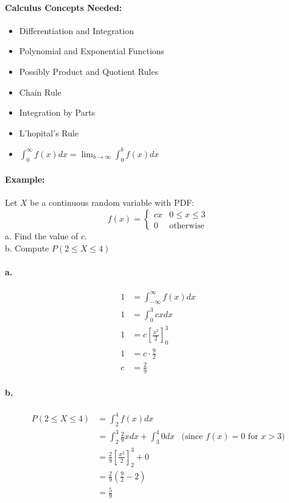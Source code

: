 \paragraph{Calculus Concepts Needed:}
\begin{itemize}
    \item Differentiation and Integration
    \item Polynomial and Exponential Functions
    \item Possibly Product and Quotient Rules
    \item Chain Rule
    \item Integration by Parts
    \item L'hopital's Rule
    \item $\int_0^\infty f(x) dx = \lim_{b \to \infty} \int_0^b f(x) dx$
\end{itemize}

\paragraph*{Example:}
Let $X$ be a continuous random variable with PDF:
\[
    f(x) = \begin{cases}
        cx & 0 \leq x \leq 3 \\
        0 & \text{otherwise}
    \end{cases}
\]
a. Find the value of $c$.\\
b. Compute $P(2 \leq X \leq 4)$\\

\paragraph*{a.}
\begin{align*}
    1 &= \int_{-\infty}^{\infty} f(x) dx \\
    1 &= \int_0^3 cx dx \\
    1 &= c \left[ \frac{x^2}{2} \right]_0^3 \\
    1 &= c \cdot \frac{9}{2} \\
    c &= \frac{2}{9}
\end{align*}

\paragraph*{b.}
\begin{align*}
    P(2 \leq X \leq 4) &= \int_2^4 f(x) dx \\
    &= \int_2^3 \frac{2}{9} x dx + \int_3^4 0 dx  & \text{(since $f(x) = 0$ for $x > 3$)}\\
    &= \frac{2}{9} \left[ \frac{x^2}{2} \right]_2^3 + 0 \\
    &= \frac{2}{9} \left( \frac{9}{2} - 2 \right) \\
    &= \frac{5}{9}
\end{align*}


